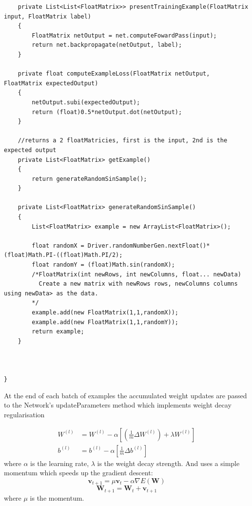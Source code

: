 \documentclass[11pt]{article} %
\begin{document}
\begin{lstlisting}
    private List<List<FloatMatrix>> presentTrainingExample(FloatMatrix input, FloatMatrix label)
    {
        FloatMatrix netOutput = net.computeFowardPass(input);
        return net.backpropagate(netOutput, label);
    }
    
    private float computeExampleLoss(FloatMatrix netOutput, FloatMatrix expectedOutput)
    {
        netOutput.subi(expectedOutput);
        return (float)0.5*netOutput.dot(netOutput);
    }
    
    //returns a 2 floatMatricies, first is the input, 2nd is the expected output
    private List<FloatMatrix> getExample()
    {
        return generateRandomSinSample();
    }
    
    private List<FloatMatrix> generateRandomSinSample()
    {
        List<FloatMatrix> example = new ArrayList<FloatMatrix>();
    
        float randomX = Driver.randomNumberGen.nextFloat()*(float)Math.PI-((float)Math.PI/2);
        float randomY = (float)Math.sin(randomX);
        /*FloatMatrix(int newRows, int newColumns, float... newData)
          Create a new matrix with newRows rows, newColumns columns using newData> as the data.
        */
        example.add(new FloatMatrix(1,1,randomX));
        example.add(new FloatMatrix(1,1,randomY));
        return example;
    }
    
 
   
}
\end{lstlisting}




At the end of each batch of examples the accumulated weight updates are passed to the Network's updateParameters method which implements weight decay regularisation 

\begin{align}
W^{(l)} &= W^{(l)} - \alpha \left[ \left(\frac{1}{m} \Delta W^{(l)} \right) + \lambda W^{(l)}\right] \\
b^{(l)} &= b^{(l)} - \alpha \left[\frac{1}{m} \Delta b^{(l)}\right]
\end{align}
where $\alpha$ is the learning rate, $\lambda$ is the weight decay strength.
And uses a simple momentum which speeds up the gradient descent:
\begin{equation}
\boldsymbol v_{t+1}=\mu \boldsymbol v_{t} -\alpha \nabla E(\boldsymbol W)
\label{eq:gradientDescentMomentum}
\end{equation}
\begin{equation}
\boldsymbol W_{t+1}=\boldsymbol W_{t}+\boldsymbol v_{t+1}
\label{eq:gradientDescentMomentum2}
\end{equation}
where $\mu$ is the momentum.
\end{document}
